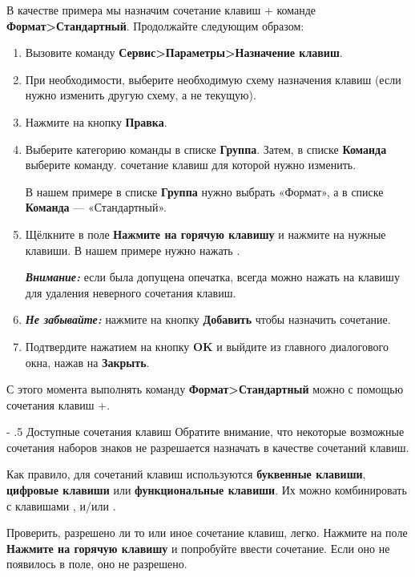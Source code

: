 ﻿\documentclass[a4paper,10pt]{article}
\makeatletter
\renewcommand\paragraph{%
   \@startsection{paragraph}{4}{0mm}%
      {-\baselineskip}%
      {.5\baselineskip}%
      {\normalfont\normalsize\bfseries}}
\makeatother
\begin{document}
 В качестве примера мы назначим сочетание клавиш + команде \textbf{Формат>Стандартный}. Продолжайте следующим образом:
 \begin{enumerate}
  \item Вызовите команду \textbf{Сервис>Параметры>Назначение клавиш}.
  \item При необходимости, выберите необходимую схему назначения клавиш (если нужно изменить другую схему, а не текущую).
  \item Нажмите на кнопку \textbf{Правка}.
  \item Выберите категорию команды в списке \textbf{Группа}. Затем, в списке \textbf{Команда} выберите команду. сочетание клавиш для которой нужно изменить.
  
  В нашем примере в списке \textbf{Группа} нужно выбрать «Формат», а в списке \textbf{Команда} — «Стандартный».
  \item Щёлкните в поле \textbf{Нажмите на горячую клавишу} и нажмите на нужные клавиши. В нашем примере нужно нажать .
  
  \begin{mdframed}[backgroundcolor=blue!10]
\textbf{\textit{Внимание:}} если была допущена опечатка, всегда можно нажать на клавишу  для удаления неверного сочетания клавиш.
\end{mdframed}
\item \textbf{\textit{Не забывайте:}} нажмите на кнопку \textbf{Добавить} чтобы назначить сочетание.
\item Подтвердите нажатием на кнопку \textbf{OK} и выйдите из главного диалогового окна, нажав на \textbf{Закрыть}.
 \end{enumerate}

 С этого момента выполнять команду \textbf{Формат>Стандартный} можно с помощью сочетания клавиш +.
 
 \paragraph{Доступные сочетания клавиш}
 Обратите внимание, что некоторые возможные сочетания наборов знаков не разрешается назначать в качестве сочетаний клавиш.
 
 Как правило, для сочетаний клавиш используются \textbf{буквенные клавиши}, \textbf{цифровые клавиши} или \textbf{функциональные клавиши}. Их можно комбинировать с клавишами ,  и/или .
 
 Проверить, разрешено ли то или иное сочетание клавиш, легко. Нажмите на поле \textbf{Нажмите на горячую клавишу} и попробуйте ввести сочетание. Если оно не появилось в поле, оно не разрешено.
 
\end{document}
